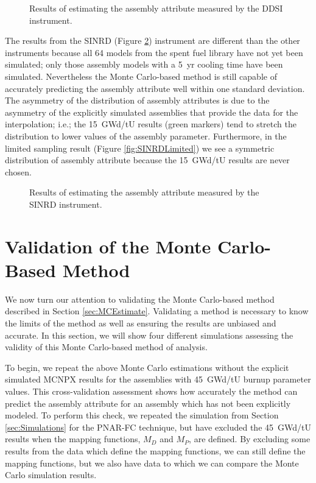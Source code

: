 \documentclass{ansnse}
\begin{document}
\begin{figure}[p!]\centering
     \qquad
    \caption{Results of estimating the assembly attribute measured by the DDSI instrument.}
    \label{fig:DDSI}
\end{figure}

The results from the SINRD (Figure \ref{fig:SINRD}) instrument are different than the other instruments because all 64 models from the spent fuel library have not yet been simulated; only those assembly models with a \SI{5}{yr} cooling time have been simulated.  Nevertheless the Monte Carlo-based method is still capable of accurately predicting the assembly attribute well within one standard deviation.  The asymmetry of the distribution of assembly attributes is due to the asymmetry of the explicitly simulated assemblies that provide the data for the interpolation; i.e.; the \SI{15}{GWd/tU} results (green markers) tend to stretch the distribution to lower values of the assembly parameter.  Furthermore, in the limited sampling result (Figure \ref{fig:SINRDLimited}) we see a symmetric distribution of assembly attribute because the \SI{15}{GWd/tU} results are never chosen.
\begin{figure}[h!]\centering
     \qquad
    \caption{Results of estimating the assembly attribute measured by the SINRD instrument.}
    \label{fig:SINRD}
\end{figure}

\clearpage
\section{Validation of the Monte Carlo-Based Method}\label{sec:Validation}
We now turn our attention to validating the Monte Carlo-based method described in Section \ref{sec:MCEstimate}.  Validating a method is necessary to know the limits of the method as well as ensuring the results are unbiased and accurate.  In this section, we will show four different simulations assessing the validity of this Monte Carlo-based method of analysis.

To begin, we repeat the above Monte Carlo estimations without the explicit simulated MCNPX results for the assemblies with \SI{45}{GWd/tU} burnup parameter values.  This cross-validation\cite{Hastie:2001The-e-0}  assessment shows how accurately the method can predict the assembly attribute for an assembly which has not been explicitly modeled.  To perform this check, we repeated the simulation from Section \ref{sec:Simulations} for the PNAR-FC technique, but have excluded the \SI{45}{GWd/tU} results when the mapping functions, $M_{D}$ and $M_{P}$, are defined.  By excluding some results from the data which define the mapping functions, we can still define the mapping functions, but we also have data to which we can compare the Monte Carlo simulation results.
\end{document}
